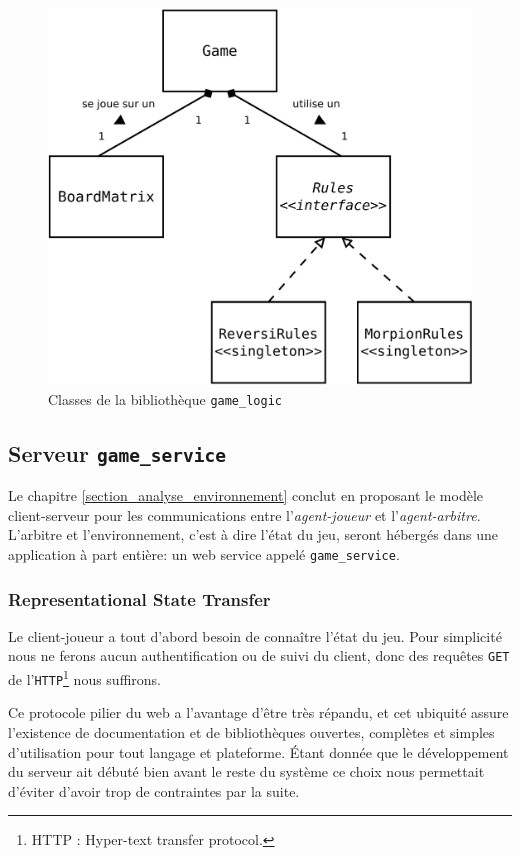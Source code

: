 \begin{figure}[H] 
\centering
\includegraphics[width=\textwidth]{files/env/game_logic} 
\caption{Classes de la bibliothèque \texttt{game\_logic}} 
\label{game_logic}
\end{figure}
\subsection{Serveur \texttt{game\_service}}
Le chapitre \ref{section_analyse_environnement} conclut en proposant le modèle client-serveur pour les communications entre l'\emph{agent-joueur} et l'\emph{agent-arbitre}. L'arbitre et l'environnement, c'est à dire l'état du jeu, seront hébergés dans une application à part entière: un \og web service \fg{} appelé \texttt{game\_service}.
\subsubsection{\og Representational State Transfer \fg{} }

Le client-joueur a tout d'abord besoin de connaître l'état du jeu. Pour simplicité nous ne ferons aucun authentification ou de suivi du client, donc des requêtes \texttt{GET} de l'\texttt{HTTP}\footnote{ HTTP : Hyper-text transfer protocol. } nous suffirons. 

Ce protocole pilier du web a l'avantage d'être très répandu, et cet ubiquité assure l'existence de documentation et de  bibliothèques ouvertes, complètes et simples d'utilisation pour tout langage et plateforme. Étant donnée que le développement du serveur ait débuté bien avant le reste du système ce choix nous permettait d'éviter d'avoir trop de contraintes par la suite.

